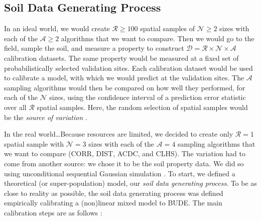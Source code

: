 \subsection{Soil Data Generating Process}
\label{subsec:simulation}

In an ideal world, we would create $\mathcal{R} \geq 100$ spatial samples of $\mathcal{N} \geq 2$ sizes 
with each of the $\mathcal{A} \geq 2$ algorithms that we want to compare. Then we would go to the field, 
sample the soil, and measure a property to construct $\mathcal{D} = \mathcal{R} \times \mathcal{N} \times 
\mathcal{A}$ calibration datasets. The same property would be measured at a fixed set of probabilistically 
selected validation sites. Each calibration dataset would be used to calibrate a model, with which we would 
predict at the validation sites. The $\mathcal{A}$ sampling algorithms would then be compared on how well 
they performed, for each of the $\mathcal{N}$ sizes, using the confidence interval of a prediction error 
statistic over all $\mathcal{R}$ spatial samples. Here, the random selection of spatial samples would be the 
\emph{source of variation} \cite{deGruijterEtAl1990}.

In the real world\dots Because resources are limited, we decided to create only $\mathcal{R} = 1$ spatial 
sample with $\mathcal{N} = 3$ sizes with each of the $\mathcal{A} = 4$ sampling algorithms that we want to 
compare (CORR, DIST, ACDC, and CLHS). The variation had to come from another source: we chose it to be the 
soil property data. We did so using unconditional sequential Gaussian simulation \cite{Goovaerts2001, 
Pebesma2004}. To start, we defined a theoretical (or super-population) model, our \emph{soil data generating 
process}. To be as close to reality as possible, the soil data generating process was defined empirically 
calibrating a (non)linear mixed model to BUDE. The main calibration steps are as follows \cite{Breiman2001, 
LiawEtAl2002, DiggleEtAl2007, Lark2012}:

